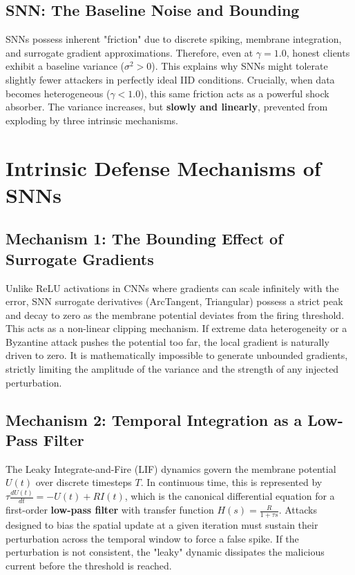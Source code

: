 \documentclass[11pt,a4paper]{article}
\begin{document}
\subsection{SNN: The Baseline Noise and Bounding}
SNNs possess inherent "friction" due to discrete spiking, membrane integration, and surrogate gradient approximations. Therefore, even at $\gamma=1.0$, honest clients exhibit a baseline variance ($\sigma^2 > 0$). This explains why SNNs might tolerate slightly fewer attackers in perfectly ideal IID conditions.
Crucially, when data becomes heterogeneous ($\gamma < 1.0$), this same friction acts as a powerful shock absorber. The variance increases, but \textbf{slowly and linearly}, prevented from exploding by three intrinsic mechanisms.

\section{Intrinsic Defense Mechanisms of SNNs}

\subsection{Mechanism 1: The Bounding Effect of Surrogate Gradients}
Unlike ReLU activations in CNNs where gradients can scale infinitely with the error, SNN surrogate derivatives (ArcTangent, Triangular) possess a strict peak and decay to zero as the membrane potential deviates from the firing threshold.
This acts as a non-linear clipping mechanism. If extreme data heterogeneity or a Byzantine attack pushes the potential too far, the local gradient is naturally driven to zero. It is mathematically impossible to generate unbounded gradients, strictly limiting the amplitude of the variance and the strength of any injected perturbation.

\subsection{Mechanism 2: Temporal Integration as a Low-Pass Filter}
The Leaky Integrate-and-Fire (LIF) dynamics govern the membrane potential $U(t)$ over discrete timesteps $T$. In continuous time, this is represented by $\tau \frac{dU(t)}{dt} = -U(t) + R I(t)$, which is the canonical differential equation for a first-order \textbf{low-pass filter} with transfer function $H(s) = \frac{R}{1 + \tau s}$.
Attacks designed to bias the spatial update at a given iteration must sustain their perturbation across the temporal window to force a false spike. If the perturbation is not consistent, the "leaky" dynamic dissipates the malicious current before the threshold is reached.
\end{document}
